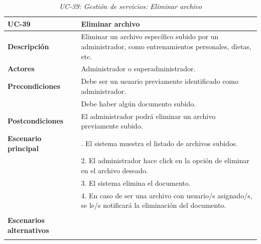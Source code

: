 \begin{table}
  \begin{center}
    \begin{tabularx}{16.4cm}{|l|X|}
      \hline
      \textbf{UC-39} & \textbf{Eliminar archivo}\\
      \hline
      \textbf{Descripción} & Eliminar un archivo específico subido por un administrador, como entrenamientos personales, dietas, etc. \\
      \hline
      \textbf{Actores} & Administrador o superadministrador.\\
      \hline
      \textbf{Precondiciones} & Debe ser un usuario previamente identificado como administrador.\\
      & Debe haber algún documento subido.\\
      \hline
      \textbf{Postcondiciones} & El administrador podrá eliminar un archivo previamente subido.\\
      \hline
      \textbf{Escenario principal} & \smallskip 1. El sistema muestra el listado de archivos subidos.\\
      & 2. El administrador hace click en la opción de eliminar en el archivo deseado.\\
      & 3. El sistema elimina el documento.\\
      & 4. En caso de ser una archivo con usuario/s asignado/s, se le/s notificará la eliminación del documento.\\
      & \\
      \hline
      \textbf{Escenarios alternativos} & \\
      & \\
      \hline
    \end{tabularx}
    \caption{\textit{UC-39: Gestión de servicios: Eliminar archivo}}
    \label{tab:CU-eliminar-archivo}
  \end{center}
\end{table}


